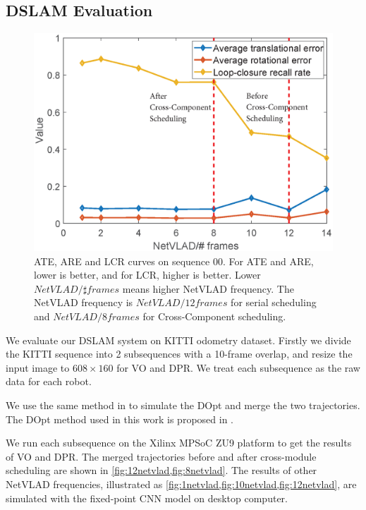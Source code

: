 \subsection{DSLAM Evaluation}
\label{sec:dlamexp}

\begin{figure}[thb]
  \centering  
  \includegraphics[width=0.95\linewidth]{fig/dslam_curve.eps}
  \caption{ATE, ARE and LCR curves on sequence 00. For ATE and ARE, lower is better, and for LCR, higher is better. Lower $NetVLAD /\sharp frames$  means higher NetVLAD frequency. The NetVLAD frequency is $NetVLAD/12frames$ for serial scheduling and  $NetVLAD/8frames$ for Cross-Component scheduling.}
  \label{fig:curves}
\end{figure}


We evaluate our DSLAM system on KITTI odometry dataset. Firstly we divide the KITTI sequence into 2 subsequences with a 10-frame overlap, and resize the input image to  $608 \times 160$ for VO and DPR. We treat each subsequence as the raw data for each robot. 

We use the same method in \cite{Cieslewski:20187ee} to simulate the DOpt and merge the two trajectories. The DOpt method used in this work is proposed in \cite{Choudhary:2017e66}.

We run each subsequence on the Xilinx MPSoC ZU9 platform to get the results of VO and DPR. The merged trajectories before and after cross-module scheduling are shown in \cref{fig:12netvlad,fig:8netvlad}. The results of other  NetVLAD frequencies, illustrated as \cref{fig:1netvlad,fig:10netvlad,fig:12netvlad}, are simulated with the fixed-point CNN model on desktop computer.

